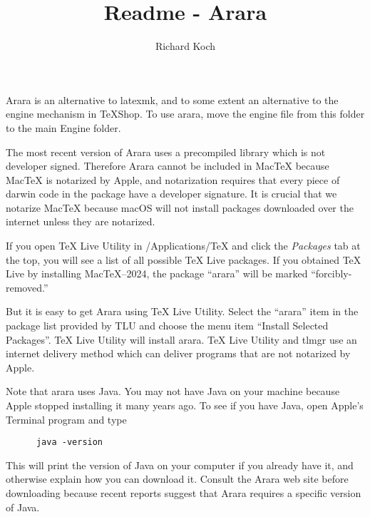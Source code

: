 \documentclass[11pt, oneside]{amsart}   	%
\title{ Readme - Arara}
\author{Richard Koch}
\begin{document}
\maketitle
Arara is an alternative to latexmk, and to some extent an alternative to the engine mechanism in TeXShop.  To use arara, move the engine file from this folder to the main Engine folder.

The most recent version of Arara uses a precompiled library which is not developer signed. Therefore Arara cannot be included in MacTeX because MacTeX is notarized by Apple, and notarization requires that every piece of darwin code in the package have a developer signature. It is crucial that we notarize MacTeX because macOS will not install packages downloaded over the internet unless they are notarized. 

If you open TeX Live Utility in /Applications/TeX and click the {\em Packages} tab at the top, you will see a list of all possible TeX Live packages. If you obtained TeX Live by installing MacTeX--2024, the package ``arara'' will be marked ``forcibly-removed.'' 

But it is easy to get Arara using TeX Live Utility. Select the ``arara'' item in the package list provided by TLU and choose the menu item ``Install Selected Packages''. TeX Live Utility will install arara. TeX Live Utility and tlmgr use an internet delivery method which can deliver programs that are not notarized by Apple.





Note that arara uses Java. You may not have Java on your machine because Apple stopped installing it many years ago. To see if you have Java, open Apple's Terminal program and type
\begin{verbatim}
      java -version
\end{verbatim}
This will print the version of Java on your computer if you already have it, and otherwise explain how you can download it. Consult the Arara web site before downloading because recent reports suggest that Arara requires a specific version of Java.
\end{document}
